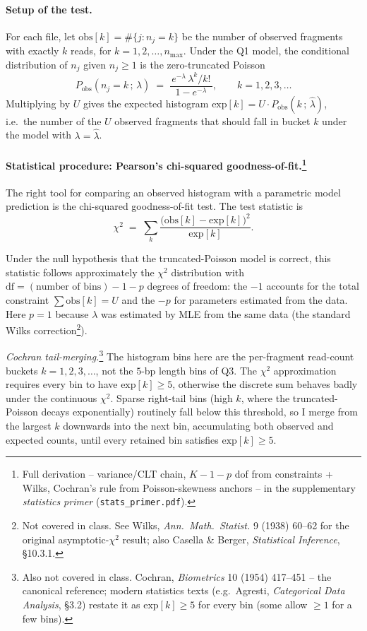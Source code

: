\documentclass[11pt,a4paper]{article}
\newcommand{\hlam}{\hat{\lambda}}
\begin{document}
\paragraph{Setup of the test.}
For each file, let $\mathrm{obs}[k] = \#\{j : n_j = k\}$ be the number of observed
fragments with exactly $k$ reads, for $k = 1, 2, \dots, n_{\max}$. Under the Q1 model,
the conditional distribution of $n_j$ given $n_j \geq 1$ is the zero-truncated Poisson
\[
   P_{\mathrm{obs}}(n_j = k \,;\, \lambda)
   \;=\; \dfrac{\,e^{-\lambda}\, \lambda^{k}/k!\,}{1 - e^{-\lambda}},
   \qquad k = 1, 2, 3, \dots
\]
Multiplying by $U$ gives the expected histogram
$\mathrm{exp}[k] = U \cdot P_{\mathrm{obs}}(k \,;\, \hlam)$, i.e.\ the number of the
$U$ observed fragments that should fall in bucket $k$ under the model with
$\lambda = \hlam$.

\paragraph{Statistical procedure: Pearson's chi-squared goodness-of-fit.\protect\footnote{Full
derivation -- variance/CLT chain, $K-1-p$ dof from constraints + Wilks,
Cochran's rule from Poisson-skewness anchors -- in the supplementary
\emph{statistics primer} (\texttt{stats\_primer.pdf}).}}
The right tool for comparing an observed histogram with a parametric model prediction
is the chi-squared goodness-of-fit test. The test statistic is
\[
   \chi^{2} \;=\; \sum_{k}
      \dfrac{\bigl(\mathrm{obs}[k] - \mathrm{exp}[k]\bigr)^{2}}{\mathrm{exp}[k]}.
\]

Under the null hypothesis that the truncated-Poisson model is correct, this
statistic follows approximately the $\chi^{2}$ distribution with $\mathrm{df} =
(\text{number of bins}) - 1 - p$ degrees of freedom: the $-1$ accounts for the
total constraint $\sum \mathrm{obs}[k] = U$ and the $-p$ for parameters estimated
from the data. Here $p = 1$ because $\lambda$ was estimated by MLE from the same
data (the standard Wilks correction\footnote{Not covered in class. See Wilks,
\emph{Ann.\ Math.\ Statist.} 9 (1938) 60--62 for the original asymptotic-$\chi^{2}$
result; also Casella \& Berger, \emph{Statistical Inference}, \S10.3.1.}).

\emph{Cochran tail-merging.}\footnote{Also not covered in class. Cochran,
\emph{Biometrics} 10 (1954) 417--451 -- the canonical reference; modern
statistics texts (e.g.\ Agresti, \emph{Categorical Data Analysis}, \S3.2)
restate it as $\mathrm{exp}[k] \geq 5$ for every bin (some allow $\geq 1$ for a
few bins).} The histogram bins here are the per-fragment read-count
buckets $k = 1, 2, 3, \dots$, not the $5$-bp length bins of Q3. The $\chi^{2}$
approximation requires every bin to have $\mathrm{exp}[k] \geq 5$, otherwise
the discrete sum behaves badly under the continuous $\chi^{2}$. Sparse
right-tail bins (high $k$, where the truncated-Poisson decays exponentially)
routinely fall below this threshold, so I merge from the largest $k$ downwards
into the next bin, accumulating both observed and expected counts, until every
retained bin satisfies $\mathrm{exp}[k] \geq 5$.
\end{document}

